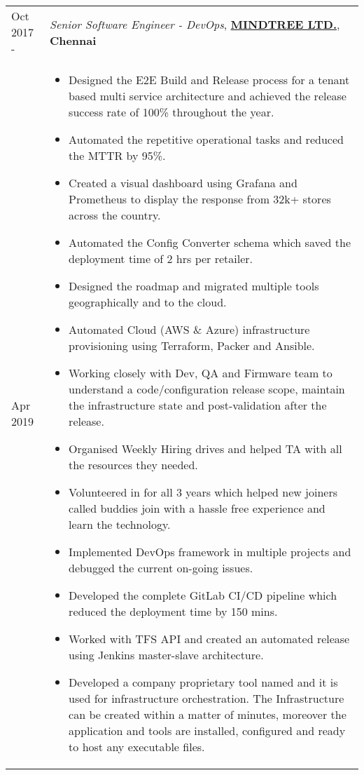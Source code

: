 \documentclass[11pt, a4paper]{article}
\begin{document}
\vspace{4mm}

\noindent\begin{tabular}{L{1.7cm}!{\color{gray}\vrule}l}
Oct 2017 -  & \textit{Senior Software Engineer - DevOps}, \textcolor{NavyBlue}{\textbf{\href{https://www.mindtree.com/about}{MINDTREE LTD.}}},  \textbf{Chennai} \\
Apr 2019 &
  \begin{minipage}[t]{0.86\textwidth}
    \begin{itemize}[leftmargin=*]
    \itemsep-0.5em 
    \item Designed the E2E Build and Release process for a tenant based multi service architecture and achieved the release success rate of 100\% throughout the year.
    \item Automated the repetitive operational tasks and reduced the MTTR by 95\%.
    \item Created a visual dashboard using Grafana and Prometheus to display the response from 32k+ stores across the country.
    \item Automated the Config Converter schema which saved the deployment time of 2 hrs per retailer.
    \item Designed the roadmap and migrated multiple tools geographically and to the cloud.
    \item Automated Cloud (AWS \& Azure) infrastructure provisioning using Terraform, Packer and Ansible.
    \item Working closely with Dev, QA and Firmware team to understand a code/configuration release scope,
maintain the infrastructure state and post-validation after the release.
    \item Organised Weekly Hiring drives and helped TA with all the resources they needed.
    \item Volunteered in  for all 3 years which helped new joiners called buddies join with a hassle free experience and learn the technology.
    \item Implemented DevOps framework in multiple projects and debugged the current on-going issues.
    \item Developed the complete GitLab CI/CD pipeline which reduced the deployment time by 150 mins.
    \item Worked with TFS API and created an automated release using Jenkins master-slave architecture.
    \item Developed a company proprietary tool named  and it is used for infrastructure orchestration. The Infrastructure can be created within a matter of minutes, moreover the application and tools are installed, configured and ready to host any executable files.

\end{itemize}
\end{minipage}
\end{tabular}
\end{document}
